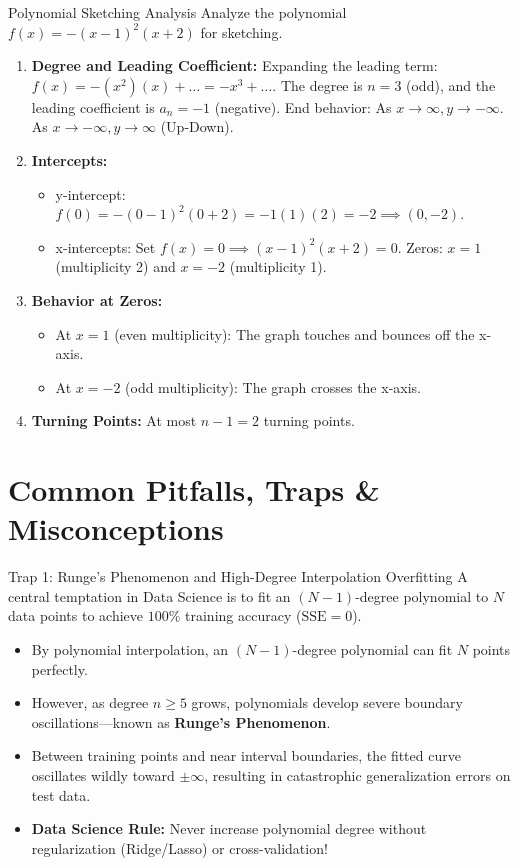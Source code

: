 \begin{examplebox}{Polynomial Sketching Analysis}
Analyze the polynomial $f(x) = -(x - 1)^2(x + 2)$ for sketching.
\begin{enumerate}
    \item \textbf{Degree and Leading Coefficient:}
    Expanding the leading term: $f(x) = -(x^2)(x) + \dots = -x^3 + \dots$.
    The degree is $n = 3$ (odd), and the leading coefficient is $a_n = -1$ (negative).
    End behavior: As $x \to \infty, y \to -\infty$. As $x \to -\infty, y \to \infty$ (Up-Down).
    \item \textbf{Intercepts:}
    \begin{itemize}
        \item y-intercept: $f(0) = -(0-1)^2(0+2) = -1(1)(2) = -2 \implies (0, -2)$.
        \item x-intercepts: Set $f(x) = 0 \implies (x-1)^2(x+2) = 0$.
        Zeros: $x = 1$ (multiplicity 2) and $x = -2$ (multiplicity 1).
    \end{itemize}
    \item \textbf{Behavior at Zeros:}
    \begin{itemize}
        \item At $x = 1$ (even multiplicity): The graph touches and bounces off the x-axis.
        \item At $x = -2$ (odd multiplicity): The graph crosses the x-axis.
    \end{itemize}
    \item \textbf{Turning Points:} At most $n - 1 = 2$ turning points.
\end{enumerate}
\end{examplebox}

\section{Common Pitfalls, Traps \& Misconceptions}

\begin{trapbox}{Trap 1: Runge's Phenomenon and High-Degree Interpolation Overfitting}
A central temptation in Data Science is to fit an $(N - 1)$-degree polynomial to $N$ data points to achieve $100\%$ training accuracy ($\text{SSE} = 0$).
\begin{itemize}
    \item By polynomial interpolation, an $(N-1)$-degree polynomial can fit $N$ points perfectly.
    \item However, as degree $n \ge 5$ grows, polynomials develop severe boundary oscillations—known as \textbf{Runge's Phenomenon}.
    \item Between training points and near interval boundaries, the fitted curve oscillates wildly toward $\pm \infty$, resulting in catastrophic generalization errors on test data.
    \item \textbf{Data Science Rule:} Never increase polynomial degree without regularization (Ridge/Lasso) or cross-validation!
\end{itemize}
\end{trapbox}

